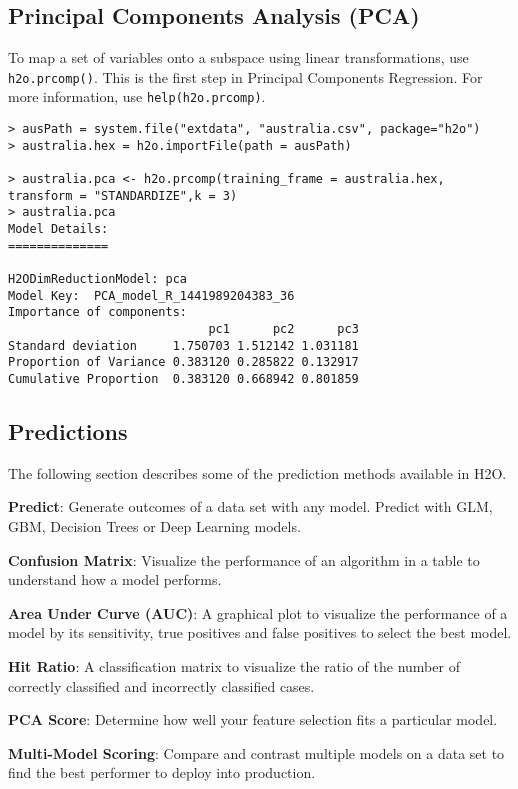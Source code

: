 {\subsection{Principal Components Analysis (PCA)}

To map a set of variables onto a subspace using linear transformations, use {\texttt{h2o.prcomp()}}. This is the first step in Principal Components Regression. For more information, use {\texttt{help(h2o.prcomp)}}.
\smallskip
\begin{lstlisting}[style=R]
> ausPath = system.file("extdata", "australia.csv", package="h2o")
> australia.hex = h2o.importFile(path = ausPath)

> australia.pca <- h2o.prcomp(training_frame = australia.hex, transform = "STANDARDIZE",k = 3)
> australia.pca
Model Details:
==============

H2ODimReductionModel: pca
Model Key:  PCA_model_R_1441989204383_36 
Importance of components:
                            pc1      pc2      pc3
Standard deviation     1.750703 1.512142 1.031181
Proportion of Variance 0.383120 0.285822 0.132917
Cumulative Proportion  0.383120 0.668942 0.801859
\end{lstlisting}

\subsection{Predictions}

The following section describes some of the prediction methods available in H2O. 

{\textbf{Predict}}: Generate outcomes of a data set with any model. Predict with GLM, GBM, Decision Trees or Deep Learning models.

{\textbf{Confusion Matrix}}: Visualize the performance of an algorithm in a table to understand how a model performs.

{\textbf{Area Under Curve (AUC)}}: A graphical plot to visualize the performance of a model by its sensitivity, true positives and false positives to select the best model.

{\textbf{Hit Ratio}}: A classification matrix to visualize the ratio of the number of correctly classified and incorrectly classified cases.

{\textbf{PCA Score}}: Determine how well your feature selection fits a particular model.

{\textbf{Multi-Model Scoring}}: Compare and contrast multiple models on a data set to find the best performer to deploy into production. 

}
